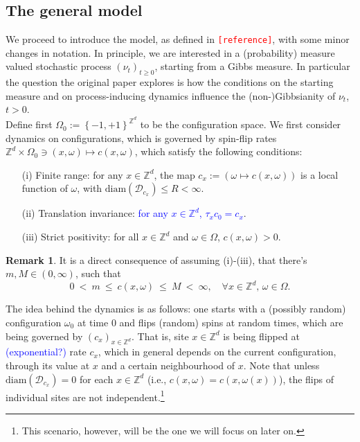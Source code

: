 \documentclass[12pt]{article}
\newcommand{\D}{\mathcal{D}}
\newcommand{\Z}{\mathbb{Z}}
\newcommand{\set}[1]{\left\{#1\right\}}
\newcommand{\1}{\mathbbm{1}}
\newcommand{\5}{\vspace{0.5cm}}
\theoremstyle{definition}
\newtheorem{rem}[thm]{Remark}
\begin{document}
\subsection{The general model}

We proceed to introduce the model, as defined in \textcolor{red}{\texttt{[reference]}}, with some minor changes in notation. In principle, we are interested in a (probability) measure valued stochastic process $(\nu_t)_{t\geq 0}$, starting from a Gibbs measure. In particular the question the original paper explores is how the conditions on the starting measure and on process-inducing dynamics influence the (non-)Gibbsianity of $\nu_t$, $t>0$. \\

Define first $\Omega_0:=\set{-1,+1}^{\Z^d}$ to be the configuration space. We first consider dynamics on configurations, which is governed by spin-flip rates $\Z^d\times\Omega_0\ni(x,\omega)\mapsto c(x,\omega)$, which satisfy the following conditions:
\begin{itemize}
	\item[(i)] Finite range: for any $x\in\Z^d$, the map $c_x:=(\omega\mapsto c(x,\omega))$ is a local function of $\omega$, with $\mathrm{diam}(\D_{c_x})\leq R<\infty$.
	\item[(ii)] Translation invariance: \textcolor{blue}{for any $x\in\Z^d$, $\tau_x c_0=c_x$}. %
	\item[(iii)] Strict positivity: for all $x\in\Z^d$ and $\omega\in\Omega$, $c(x,\omega)>0$.
\end{itemize}

\begin{rem}
It is a direct consequence of assuming (i)-(iii), that there's $m,M\in(0,\infty)$, such that 
$$0 ~<~ m ~\leq~ c(x,\omega) ~\leq~ M ~<~ \infty, \quad \forall x\in\Z^d,\,\omega\in\Omega.$$
\end{rem}

The idea behind the dynamics is as follows: one starts with a (possibly random) configuration $\omega_0$ at time $0$ and flips (random) spins at random times, which are being governed by $(c_x)_{x\in\Z^d}$. That is, site $x\in\Z^d$ is being flipped at \textcolor{blue}{(exponential?)} rate $c_x$, which in general depends on the current configuration, through its value at $x$ and a certain neighbourhood of $x$. Note that unless $\mathrm{diam}(\D_{c_x})=0$ for each $x\in\Z^d$ (i.e., $c(x,\omega)=c(x,\omega(x))$), the flips of individual sites are not independent.\footnote{This scenario, however, will be the one we will focus on later on.} \\
\end{document}
